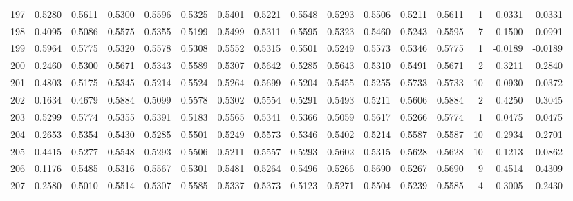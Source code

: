 \begin{tabular}{lrrrrrrrrrrrrrrr}
197 &      0.5280 &  0.5611 &  0.5300 &  0.5596 &  0.5325 &  0.5401 &  0.5221 &  0.5548 &  0.5293 &  0.5506 &   0.5211 &     0.5611 &      1 &                    0.0331 &                     0.0331 \\
198 &      0.4095 &  0.5086 &  0.5575 &  0.5355 &  0.5199 &  0.5499 &  0.5311 &  0.5595 &  0.5323 &  0.5460 &   0.5243 &     0.5595 &      7 &                    0.1500 &                     0.0991 \\
199 &      0.5964 &  0.5775 &  0.5320 &  0.5578 &  0.5308 &  0.5552 &  0.5315 &  0.5501 &  0.5249 &  0.5573 &   0.5346 &     0.5775 &      1 &                   -0.0189 &                    -0.0189 \\
200 &      0.2460 &  0.5300 &  0.5671 &  0.5343 &  0.5589 &  0.5307 &  0.5642 &  0.5285 &  0.5643 &  0.5310 &   0.5491 &     0.5671 &      2 &                    0.3211 &                     0.2840 \\
201 &      0.4803 &  0.5175 &  0.5345 &  0.5214 &  0.5524 &  0.5264 &  0.5699 &  0.5204 &  0.5455 &  0.5255 &   0.5733 &     0.5733 &     10 &                    0.0930 &                     0.0372 \\
202 &      0.1634 &  0.4679 &  0.5884 &  0.5099 &  0.5578 &  0.5302 &  0.5554 &  0.5291 &  0.5493 &  0.5211 &   0.5606 &     0.5884 &      2 &                    0.4250 &                     0.3045 \\
203 &      0.5299 &  0.5774 &  0.5355 &  0.5391 &  0.5183 &  0.5565 &  0.5341 &  0.5366 &  0.5059 &  0.5617 &   0.5266 &     0.5774 &      1 &                    0.0475 &                     0.0475 \\
204 &      0.2653 &  0.5354 &  0.5430 &  0.5285 &  0.5501 &  0.5249 &  0.5573 &  0.5346 &  0.5402 &  0.5214 &   0.5587 &     0.5587 &     10 &                    0.2934 &                     0.2701 \\
205 &      0.4415 &  0.5277 &  0.5548 &  0.5293 &  0.5506 &  0.5211 &  0.5557 &  0.5293 &  0.5602 &  0.5315 &   0.5628 &     0.5628 &     10 &                    0.1213 &                     0.0862 \\
206 &      0.1176 &  0.5485 &  0.5316 &  0.5567 &  0.5301 &  0.5481 &  0.5264 &  0.5496 &  0.5266 &  0.5690 &   0.5267 &     0.5690 &      9 &                    0.4514 &                     0.4309 \\
207 &      0.2580 &  0.5010 &  0.5514 &  0.5307 &  0.5585 &  0.5337 &  0.5373 &  0.5123 &  0.5271 &  0.5504 &   0.5239 &     0.5585 &      4 &                    0.3005 &                     0.2430 \\

\end{tabular}
